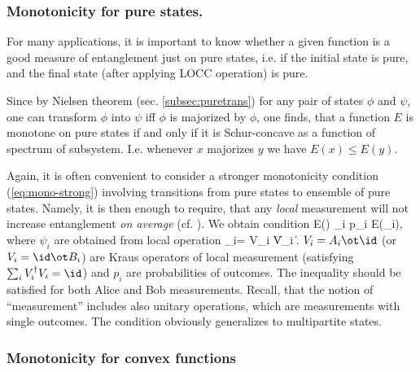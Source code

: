 \documentclass[rmp,12pt,preprint]{revtex4-2}
\begin{document}
\subsubsection{Monotonicity for pure states.}
\label{subsubsec:monot_pur}
For many applications, it is important to know whether a given function is a good measure
of entanglement just  on pure states, i.e. if the initial state is pure,
and the final state (after applying LOCC operation) is pure.

Since by Nielsen theorem (sec. \ref{subsec:puretrans}) for any pair
of states $\phi$ and $\psi$,
one can transform $\phi$ into $\psi$ iff  $\phi$ is majorized by $\phi$,
one finds, that a function $E$ is monotone on pure states
if and only if it is Schur-concave as a function of spectrum
of subsystem. I.e. whenever $x$ majorizes $y$ we have $E(x)\leq E(y)$.

Again, it is often convenient to consider a stronger monotonicity
condition (\ref{eq:mono-strong}) involving  transitions from pure
states to ensemble of pure states. Namely, it is then enough to
require, that any {\it local} measurement will not increase
entanglement {\it on average} (cf. \cite{LPSW1999}). We obtain condition
\be
E(\psi) \geq \sum_i p_i E(\psi_i), \label{eq:mono-pure}
\ee
where
$\psi_i$ are obtained from  local operation \be \psi_i= {V_i \psi
\over \|V_i \psi\|}. \ee $V_i=A_i\ot \id $ (or $V_i = \id\ot B_i$) are
Kraus operators of local  measurement (satisfying $\sum_i
V_i^\dagger V_i=\id$) and $p_{i}$ are probabilities of
outcomes. The inequality should be satisfied for both Alice
and Bob measurements. Recall, that the notion of ``measurement''
includes also unitary operations, which are measurements with single
outcomes. The condition obviously generalizes to multipartite
states.









\subsubsection{Monotonicity for convex functions}
\label{mono-convex}
\end{document}
